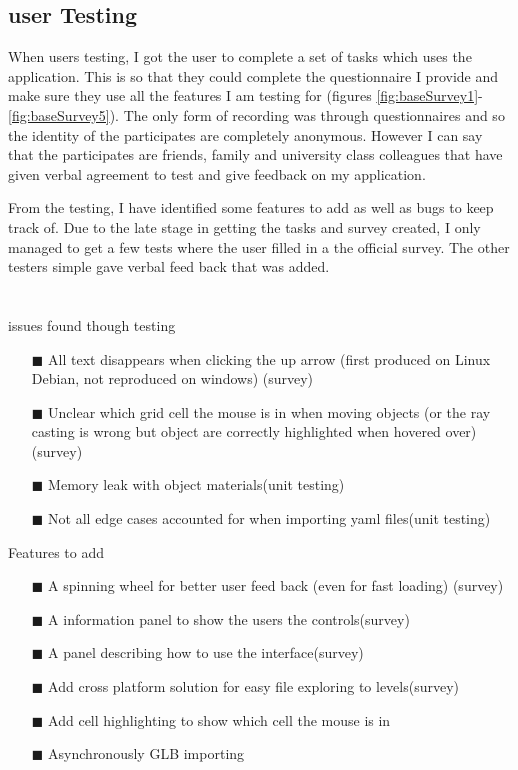 
\subsection{user Testing}
When users testing, I got the user to complete a set of tasks which uses the application. This is so that they could complete the questionnaire I provide and make sure they use all the features I am testing for (figures \ref{fig:baseSurvey1}-\ref{fig:baseSurvey5}). The only form of recording was through questionnaires and so the identity of the participates are completely anonymous. However I can say that the participates are friends, family and university class colleagues that have given verbal agreement to test and give feedback on my application.

From the testing, I have identified some features to add as well as bugs to keep track of. Due to the late stage in getting the tasks and survey created, I only managed to get a few tests where the user filled in a the official survey. The other testers simple gave verbal feed back that was added.
\\ \\ \\

issues found though testing
\begin{enumerate}
  \item[$\blacksquare$] All text disappears when clicking the up arrow (first produced on Linux Debian, not reproduced on windows) (survey)
  \item[$\blacksquare$] Unclear which grid cell the mouse is in when moving objects (or the ray casting is wrong but object are correctly highlighted when hovered over)(survey)
  \item[$\blacksquare$] Memory leak with object materials(unit testing)
  \item[$\blacksquare$] Not all edge cases accounted for when importing yaml files(unit testing)
\end{enumerate}
Features to add
\begin{enumerate}
  \item[$\blacksquare$] A spinning wheel for better user feed back (even for fast loading) (survey)
  \item[$\blacksquare$] A information panel to show the users the controls(survey)
  \item[$\blacksquare$] A panel describing how to use the interface(survey)
  \item[$\blacksquare$] Add cross platform solution for easy file exploring to levels(survey)
  \item[$\blacksquare$] Add cell highlighting to show which cell the mouse is in
  \item[$\blacksquare$] Asynchronously GLB importing
\end{enumerate}

